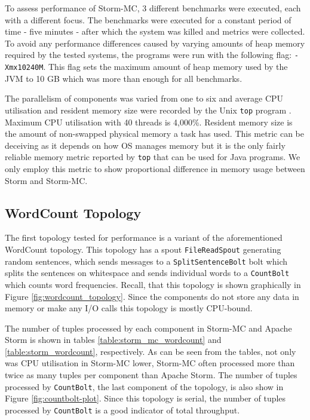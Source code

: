 \documentclass[bsc,logo,frontabs,twoside,singlespacing,normalheadings,parskip]{infthesis}\usepackage[]{graphicx}\usepackage[]{color}
\begin{document}
To assess performance of Storm-MC, 3 different benchmarks were executed, each with a different focus. The benchmarks were executed for a constant period of time - five minutes - after which the system was killed and metrics were collected. To avoid any performance differences caused by varying amounts of heap memory required by the tested systems, the programs were run with the following flag: \texttt{-Xmx10240M}. This flag sets the maximum amount of heap memory used by the JVM to 10 GB which was more than enough for all benchmarks.

The parallelism of components was varied from one to six and average CPU utilisation and resident memory size were recorded by the Unix \texttt{top} program \citep{UnixTop}. Maximum CPU utilisation with 40 threads is 4,000\%. Resident memory size is the amount of non-swapped physical memory a task has used. This metric can be deceiving as it depends on how OS manages memory but it is the only fairly reliable memory metric reported by \texttt{top} that can be used for Java programs. We only employ this metric to show proportional difference in memory usage between Storm and Storm-MC.

\subsection{WordCount Topology}

The first topology tested for performance is a variant of the aforementioned WordCount topology. This topology has a spout \texttt{FileReadSpout} generating random sentences, which sends messages to a \texttt{SplitSentenceBolt} bolt which splits the sentences on whitespace and sends individual words to a \texttt{CountBolt} which counts word frequencies. Recall, that this topology is shown graphically in Figure \ref{fig:wordcount_topology}. Since the components do not store any data in memory or make any I/O calls this topology is mostly CPU-bound.

The number of tuples processed by each component in Storm-MC and Apache Storm is shown in tables \ref{table:storm_mc_wordcount} and \ref{table:storm_wordcount}, respectively. As can be seen from the tables, not only was CPU utilisation in Storm-MC lower, Storm-MC often processed more than twice as many tuples per component than Apache Storm.  The number of tuples processed by \texttt{CountBolt}, the last component of the topology, is also show in Figure \ref{fig:countbolt-plot}. Since this topology is serial, the number of tuples processed by \texttt{CountBolt} is a good indicator of total throughput.
\end{document}
